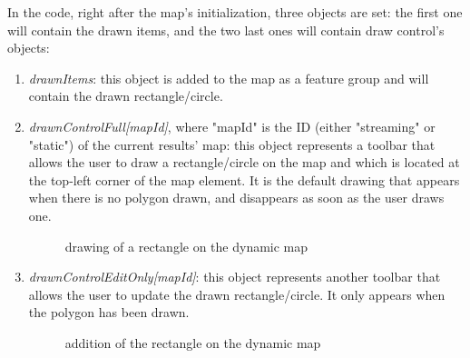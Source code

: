 \documentclass[a4paper,11pt]{report}
\begin{document}
In the code, right after the map's initialization, three objects are set: the first one will contain the drawn items, and the two last ones will contain draw control's objects:
\begin{enumerate}
	\item \emph{drawnItems}: this object is added to the map as a feature group and will contain the drawn rectangle/circle.
	\item \emph{drawnControlFull[mapId]}, where "mapId" is the ID (either "streaming" or "static") of the current results' map: this object represents a toolbar that allows the user to draw a rectangle/circle on the map and which is located at the top-left corner of the map element. It is the default drawing that appears when there is no polygon drawn, and disappears as soon as the user draws one.
	\begin{figure}[H]
	\vspace{-5pt}
	\begin{center}
	\vspace{-5pt}
	\caption{drawing of a rectangle on the dynamic map}
	\end{center}
	\end{figure}
	\vspace{-20pt}
	\newpage

	\item \emph{drawnControlEditOnly[mapId]}: this object represents another toolbar that allows the user to update the drawn rectangle/circle. It only appears when the polygon has been drawn.
	\begin{figure}[H]
	\vspace{-5pt}
	\begin{center}
	\vspace{-5pt}
	\caption{addition of the rectangle on the dynamic map}
	\end{center}
	\end{figure}
	\vspace{-20pt}
\end{enumerate}
\end{document}

